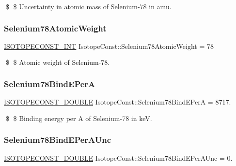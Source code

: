 \$ \$ Uncertainty in atomic mass of Selenium-\/78 in amu. \mbox{\label{group___isotope_const-_selenium-_se78_ga4db90437ef1fc89406e99388b7fac0a6}} 
\subsubsection{\texorpdfstring{Selenium78\+Atomic\+Weight}{Selenium78AtomicWeight}}
{\footnotesize\ttfamily \mbox{\hyperlink{group___isotope_const-_macros_ga5f18360b3e99483a35c32d789e62621c}{I\+S\+O\+T\+O\+P\+E\+C\+O\+N\+S\+T\+\_\+\+I\+NT}} Isotope\+Const\+::\+Selenium78\+Atomic\+Weight = 78}

\$ \$ Atomic weight of Selenium-\/78. \mbox{\label{group___isotope_const-_selenium-_se78_ga4f9576291f2ccaaf9259ee3e3dfb4fe9}} 
\subsubsection{\texorpdfstring{Selenium78\+Bind\+E\+PerA}{Selenium78BindEPerA}}
{\footnotesize\ttfamily \mbox{\hyperlink{group___isotope_const-_macros_ga8f45a7272ce02c0b4c65c44636ed719a}{I\+S\+O\+T\+O\+P\+E\+C\+O\+N\+S\+T\+\_\+\+D\+O\+U\+B\+LE}} Isotope\+Const\+::\+Selenium78\+Bind\+E\+PerA = 8717.}

\$ \$ Binding energy per A of Selenium-\/78 in keV. \mbox{\label{group___isotope_const-_selenium-_se78_gae36c652f7c35db835673cea8078da079}} 
\subsubsection{\texorpdfstring{Selenium78\+Bind\+E\+Per\+A\+Unc}{Selenium78BindEPerAUnc}}
{\footnotesize\ttfamily \mbox{\hyperlink{group___isotope_const-_macros_ga8f45a7272ce02c0b4c65c44636ed719a}{I\+S\+O\+T\+O\+P\+E\+C\+O\+N\+S\+T\+\_\+\+D\+O\+U\+B\+LE}} Isotope\+Const\+::\+Selenium78\+Bind\+E\+Per\+A\+Unc = 0.}


